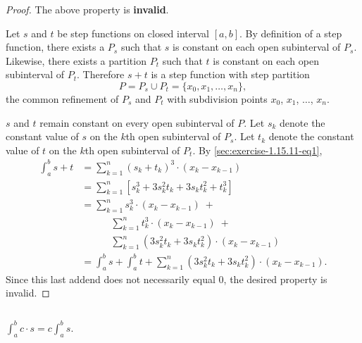 \documentclass{report}
\begin{document}
\begin{proof}

  The above property is \textbf{invalid}.

  \vspace{6pt}

  Let $s$ and $t$ be step functions on closed interval $[a, b]$.
  By definition of a step function, there exists a 
    $P_s$ such that $s$ is constant on each open subinterval of $P_s$.
  Likewise, there exists a partition $P_t$ such that $t$ is constant on each
    open subinterval of $P_t$.
  Therefore $s + t$ is a step function with step partition
    $$P = P_s \cup P_t = \{x_0, x_1, \ldots, x_n\},$$
    the common refinement of $P_s$ and $P_t$ with subdivision points
    $x_0$, $x_1$, $\ldots$, $x_n$.

  $s$ and $t$ remain constant on every open subinterval of $P$.
  Let $s_k$ denote the constant value of $s$ on the $k$th open subinterval of
    $P_s$.
  Let $t_k$ denote the constant value of $t$ on the $k$th open subinterval of
    $P_t$.
  By \eqref{sec:exercise-1.15.11-eq1},
    \begin{align*}
      \int_a^b s + t
        & = \sum_{k=1}^n (s_k + t_k)^3 \cdot (x_k - x_{k-1}) \\
        & = \sum_{k=1}^n
            \left[ s_k^3 + 3s_k^2t_k + 3s_kt_k^2 + t_k^3 \right] \\
        & = \sum_{k=1}^n s_k^3 \cdot (x_k - x_{k-1}) \;+ \\
          & \quad\qquad
            \sum_{k=1}^n t_k^3 \cdot (x_k - x_{k-1}) \;+ \\
          & \quad\qquad
            \sum_{k=1}^n (3s_k^2t_k + 3s_kt_k^2) \cdot (x_k - x_{k - 1}) \\
        & = \int_a^b s + \int_a^b t +
            \sum_{k=1}^n (3s_k^2t_k + 3s_kt_k^2) \cdot (x_k - x_{k - 1}).
    \end{align*}
  Since this last addend does not necessarily equal $0$, the desired property is
    invalid.

\end{proof}

\subsection{}%
\label{sub:exercise-1.15.11c}

$\int_a^b c \cdot s = c \int_a^b s$.

\end{document}
